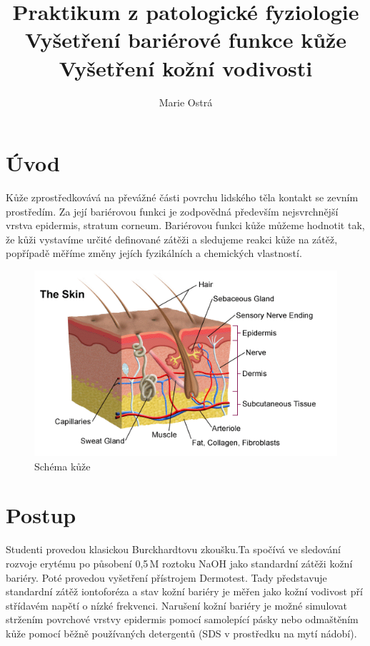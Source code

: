 \documentclass[12pt]{article}
\begin{document}
\title{Praktikum z patologické fyziologie \\
Vyšetření bariérové funkce kůže \\
Vyšetření kožní vodivosti}
\author{Marie Ostrá}
\maketitle

\section{Úvod}

Kůže zprostředkovává na převážné části povrchu lidského těla kontakt se zevním prostředím. Za
její bariérovou funkci je zodpovědná především nejsvrchnější vrstva epidermis, stratum corneum.
Bariérovou funkci kůže můžeme hodnotit tak, že kůži vystavíme určité definované zátěži a
sledujeme reakci kůže na zátěž, popřípadě měříme změny jejích fyzikálních a chemických
vlastností.

\begin{figure}[hb]
	\begin{centering}
	\includegraphics[width=0.7\linewidth]{kuze.png}
	\caption{Schéma kůže}
	\end{centering}
\end{figure}

\section{Postup}

Studenti provedou klasickou Burckhardtovu zkoušku.Ta spočívá ve sledování rozvoje erytému po
působení 0,5\,M roztoku NaOH jako standardní zátěži kožní bariéry. Poté provedou vyšetření
přístrojem Dermotest. Tady představuje standardní zátěž iontoforéza a stav kožní bariéry je
měřen jako kožní vodivost pří střídavém napětí o nízké frekvenci. Narušení kožní bariéry je
možné simulovat stržením povrchové vrstvy epidermis pomocí samolepící pásky nebo
odmaštěním kůže pomocí běžně používaných detergentů (SDS v prostředku na mytí nádobí).
\end{document}
